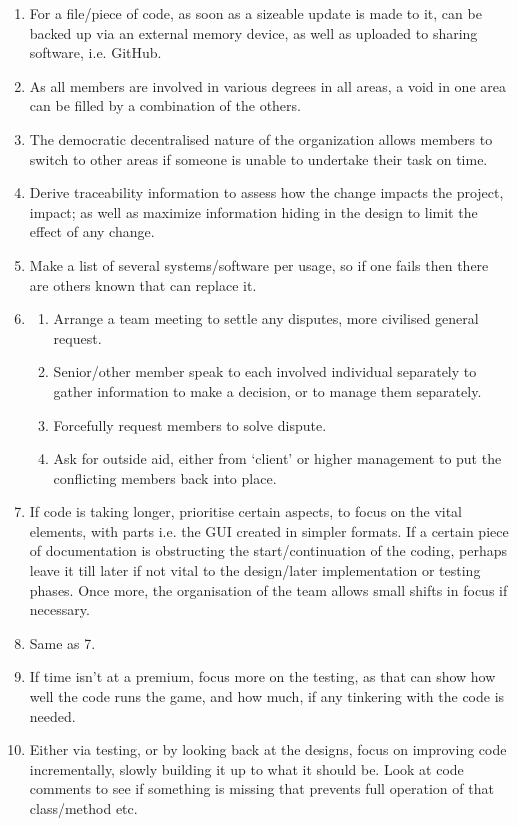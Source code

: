 \documentclass[11pt]{article}
\begin{document}
\begin{enumerate}
\item For a file/piece of code, as soon as a sizeable update is made to it, can be backed up via an external memory device, as well as uploaded to sharing software, i.e. GitHub.
\item As all members are involved in various degrees in all areas, a void in one area can be filled by a combination of the others.
\item The democratic decentralised nature of the organization allows members to switch to other areas if someone is unable to undertake their task on time. 
\item Derive traceability information to assess how the change impacts the project, impact; as well as maximize information hiding in the design to limit the effect of any change. 
\item Make a list of several systems/software per usage, so if one fails then there are others known that can replace it. 
\item \begin{enumerate}
  \item Arrange a team meeting to settle any disputes, more civilised general request.
  \item Senior/other member speak to each involved individual separately to gather information to make a decision, or to manage them separately.
  \item Forcefully request members to solve dispute.
  \item Ask for outside aid, either from `client' or higher management to put the conflicting members back into place. 
\end{enumerate}
\item If code is taking longer, prioritise certain aspects, to focus on the vital elements, with parts i.e. the GUI created in simpler formats. If a certain piece of documentation is obstructing the start/continuation of the coding, perhaps leave it till later if not vital to the design/later implementation or testing phases. Once more, the organisation of the team allows small shifts in focus if necessary. 
\item Same as 7.
\item If time isn’t at a premium, focus more on the testing, as that can show how well the code runs the game, and how much, if any tinkering with the code is needed. 
\item Either via testing, or by looking back at the designs, focus on improving code incrementally, slowly building it up to what it should be. Look at code comments to see if something is missing that prevents full operation of that class/method etc. 

\end{enumerate}
\end{document}
